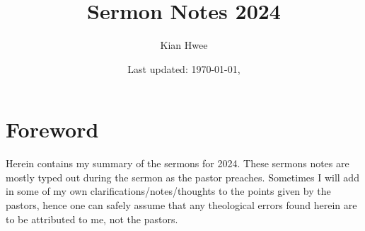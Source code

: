 \documentclass[12pt, a4paper]{article} %
\title{Sermon Notes 2024}
\author{Kian Hwee}
\date{\small Last updated: \today, \currenttime} %
\numberwithin{equation}{section} %
\theoremstyle{plain}
\theoremstyle{remark}
\theoremstyle{plain}
\theoremstyle{definition}
\theoremstyle{remark}
\begin{document}
  \maketitle
  \section*{Foreword}
    Herein contains my summary of the sermons for 2024.  These sermons notes
    are mostly typed out during the sermon as the pastor preaches.  Sometimes
    I will add in some of my own clarifications/notes/thoughts to the points
    given by the pastors, hence one can safely assume that any theological
    errors found herein are to be attributed to me, not the pastors. 
  \tableofcontents %
  
  
  
  
  
  
  
  
  
  
  
  
  
  
  
  
  
\end{document}
